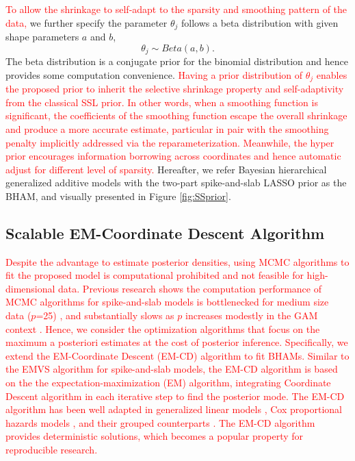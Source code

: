 \documentclass[AMA,STIX1COL,]{WileyNJD-v2}
\begin{document}
\textcolor{red}{To allow the shrinkage to self-adapt to the sparsity and smoothing pattern of the data, }we
further specify the parameter \(\theta_j\) follows a beta distribution
with given shape parameters \(a\) and \(b\), \[
\theta_j \sim Beta(a, b).
\] The beta distribution is a conjugate prior for the binomial
distribution and hence provides some computation convenience.
\textcolor{red}{Having a prior distribution of $\theta_j$ enables the proposed prior to inherit the selective shrinkage property and self-adaptivity \cite{Bai2021Review} from the classical SSL prior. In other words, when a smoothing function is significant, the coefficients of the smoothing function escape the overall shrinkage and produce a more accurate estimate, particular in pair with the smoothing penalty implicitly addressed via the reparameterization. Meanwhile, the hyper prior encourages information borrowing across coordinates and hence automatic adjust for different level of sparsity.}
Hereafter, we refer Bayesian hierarchical generalized additive models
with the two-part spike-and-slab LASSO prior as the BHAM, and visually
presented in Figure \ref{fig:SSprior}.

\subsection{Scalable EM-Coordinate Descent Algorithm}

\textcolor{red}{Despite the advantage to estimate posterior densities, using MCMC algorithms to fit the proposed model is computational prohibited and not feasible for high-dimensional data. Previous research shows the computation performance of MCMC algorithms for spike-and-slab models is bottlenecked for medium size data ($p$=25) \cite{George1997}, and substantially slows as $p$ increases modestly in the GAM context \cite{Scheipl2013}. Hence, we consider the optimization algorithms that focus on the maximum a posteriori estimates at the cost of posterior inference. Specifically, we
extend the EM-Coordinate Descent (EM-CD) algorithm to fit BHAMs. Similar to the EMVS algorithm \cite{Rockova2014a} for spike-and-slab models, the EM-CD algorithm is based on the the expectation-maximization (EM) algorithm, integrating Coordinate Descent algorithm in each iterative step to find the posterior mode. The EM-CD algorithm has been well adapted in generalized linear models \cite{Tang2017a}, Cox proportional hazards models \cite{Tang2017}, and their grouped counterparts \cite{Tang2018, Tang2019}. The EM-CD algorithm provides deterministic solutions, which becomes a popular property for reproducible research.}
\end{document}
